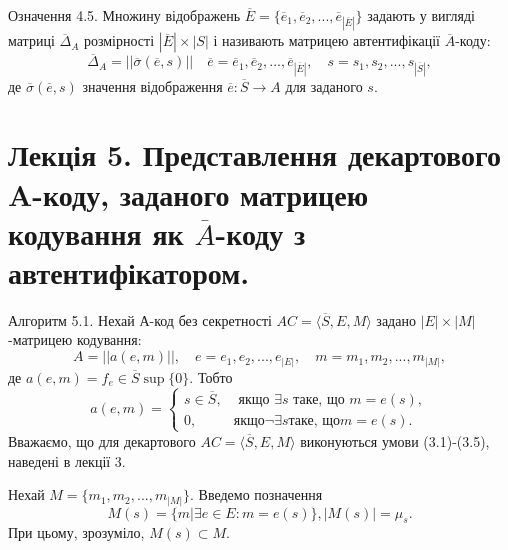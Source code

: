 \begin{definition}
    Означення 4.5. Множину відображень $\overline{E} = \{\overline{e}_1, \overline{e}_2, ..., \overline{e}_{|\overline{E}|}\}$ задають у
    вигляді матриці $\overline{\Delta}_A$ розмірності $|\overline{E}| \times |S|$ і називають матрицею автентифікації
    $\overline{A}$-коду:
    \begin{equation*}
        \overline{\Delta}_A = ||\overline{\sigma}(\overline{e}, s)||
            \quad \overline{e} = \overline{e}_1, \overline{e}_2, ..., \overline{e}_{|\overline{E}|},
            \quad s = s_1, s_2, ..., s_{|\overline{S}|},
    \end{equation*}
    де $\overline{\sigma}(\overline{e}, s)$ значення відображення $\overline{e}: \overline{S} \rightarrow A$ для заданого $s$.
\end{definition}

\section[Лекція 5. Представлення декартового A-коду, заданого матрицею кодування як neg-A-коду з автентифікатором.]{Лекція 5. Представлення декартового A-коду, заданого матрицею кодування як \(\overline{A}\)-коду з автентифікатором.}

\begin{example}
    
\end{example}
Алгоритм 5.1.
Нехай А-код без секретності $AC = \langle \overline{S}, E, M \rangle$ задано $|E| \times |M|$-матрицею
кодування:
\begin{equation*}
    A = ||a(e, m)||, \quad e = e_1, e_2, ..., e_{|E|}, \quad m = m_1, m_2, ..., m_{|M|},
\end{equation*}
де $a(e, m) = f_e \in \overline{S} \sup \{0\}$. Тобто
\begin{equation*}
    a(e, m) = \left\{ \begin{array}{ll}
        s \in \overline{S}, & \text{ якщо } \exists s \text{ таке, що } m = e(s),\\
        0, & \text{якщо} \neg\exists s \text{таке, що} m = e(s).
    \end{array} \right.
\end{equation*}
Вважаємо, що для декартового $AC = \langle \overline{S}, E, M \rangle$ виконуються умови
(3.1)-(3.5), наведені в лекції 3.

Нехай $M = \{m_1, m_2, ..., m_{|M|}\}$. Введемо позначення
\begin{equation*}
    M(s) = \{m | \exists e \in E: m = e(s)\}, |M(s)| = \mu_{s}.
\end{equation*}
При цьому, зрозуміло, $M(s) \subset M$.

